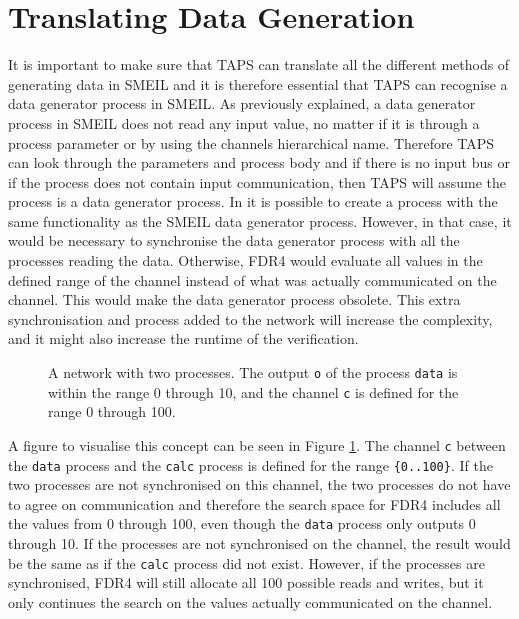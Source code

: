 \section{Translating Data Generation}
It is important to make sure that TAPS can translate all the different methods of generating data in SMEIL and it is therefore essential that TAPS can recognise a data generator process in SMEIL. As previously explained, a data generator process in SMEIL does not read any input value, no matter if it is through a process parameter or by using the channels hierarchical name. Therefore TAPS can look through the parameters and process body and if there is no input bus or if the process does not contain input communication, then TAPS will assume the process is a data generator process. In \cspm{} it is possible to create a process with the same functionality as the SMEIL data generator process. However, in that case, it would be necessary to synchronise the data generator process with all the processes reading the data. Otherwise, FDR4 would evaluate all values in the defined range of the channel instead of what was actually communicated on the channel. This would make the data generator process obsolete. This extra synchronisation and process added to the \cspm{} network will increase the complexity, and it might also increase the runtime of the verification.
\begin{figure}
    \centering
    \caption{A \cspm{} network with two processes. The output \texttt{o} of the process \texttt{data} is within the range 0 through 10, and the channel \texttt{c} is defined for the range 0 through 100.}
    \label{fig:csp_data_generator_process}
\end{figure}
A figure to visualise this concept can be seen in Figure \ref{fig:csp_data_generator_process}. The channel \texttt{c} between the \texttt{data} process and the \texttt{calc} process is defined for the range \texttt{\{0..100\}}. If the two processes are not synchronised on this channel, the two processes do not have to agree on communication and therefore the search space for FDR4 includes all the values from 0 through 100, even though the \texttt{data} process only outputs 0 through 10. If the processes are not synchronised on the channel, the result would be the same as if the \texttt{calc} process did not exist. However, if the processes are synchronised, FDR4 will still allocate all 100 possible reads and writes, but it only continues the search on the values actually communicated on the channel.
